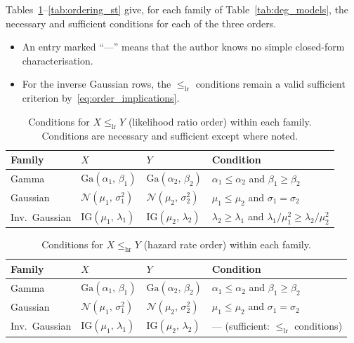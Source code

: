 \documentclass[11pt,a4paper]{article}
\theoremstyle{plain}
\theoremstyle{definition}
\theoremstyle{remark}
\begin{document}
Tables~\ref{tab:ordering_lr}--\ref{tab:ordering_st} give, for each family of Table~\ref{tab:deg_models}, the necessary and sufficient conditions for each of the three orders.
\begin{itemize}
  \item An entry marked ``---'' means that the author knows no simple closed-form characterisation.
  \item For the inverse Gaussian rows, the $\le_{\mathrm{lr}}$ conditions remain a valid sufficient criterion by~\eqref{eq:order_implications}.
\end{itemize}

\begin{table}[htbp]
\centering
\caption{Conditions for $X \le_{\mathrm{lr}} Y$ (likelihood ratio order) within each family.  Conditions are necessary and sufficient except where noted.}
\label{tab:ordering_lr}
\small
\begin{tabularx}{\linewidth}{@{}>{\hsize=0.604\hsize\raggedright\arraybackslash}X>{\hsize=1.094\hsize\raggedright\arraybackslash}X>{\hsize=1.151\hsize\raggedright\arraybackslash}X>{\hsize=1.151\hsize\raggedright\arraybackslash}X@{}}
\toprule
\rowcolor{headgrey}
\textbf{Family} & $X$ & $Y$ & \textbf{Condition} \\
\midrule
Gamma
  & $\mathrm{Ga}(\alpha_1,\,\beta_1)$
  & $\mathrm{Ga}(\alpha_2,\,\beta_2)$
  & $\alpha_1 \le \alpha_2$ and $\beta_1 \ge \beta_2$ \\[4pt]
Gaussian
  & $\mathcal{N}(\mu_1,\,\sigma_1^2)$
  & $\mathcal{N}(\mu_2,\,\sigma_2^2)$
  & $\mu_1 \le \mu_2$ and $\sigma_1 = \sigma_2$ \\[4pt]
Inv.\ Gaussian
  & $\mathrm{IG}(\mu_1,\,\lambda_1)$
  & $\mathrm{IG}(\mu_2,\,\lambda_2)$
  & $\lambda_2 \ge \lambda_1$ and $\lambda_1/\mu_1^2 \ge \lambda_2/\mu_2^2$ \\[4pt]
\bottomrule
\end{tabularx}
\end{table}

\begin{table}[htbp]
\centering
\caption{Conditions for $X \le_{\mathrm{hr}} Y$ (hazard rate order) within each family.}
\label{tab:ordering_hr}
\small
\begin{tabularx}{\linewidth}{@{}>{\hsize=0.604\hsize\raggedright\arraybackslash}X>{\hsize=1.094\hsize\raggedright\arraybackslash}X>{\hsize=1.151\hsize\raggedright\arraybackslash}X>{\hsize=1.151\hsize\raggedright\arraybackslash}X@{}}
\toprule
\rowcolor{headgrey}
\textbf{Family} & $X$ & $Y$ & \textbf{Condition} \\
\midrule
Gamma
  & $\mathrm{Ga}(\alpha_1,\,\beta_1)$
  & $\mathrm{Ga}(\alpha_2,\,\beta_2)$
  & $\alpha_1 \le \alpha_2$ and $\beta_1 \ge \beta_2$ \\[4pt]
Gaussian
  & $\mathcal{N}(\mu_1,\,\sigma_1^2)$
  & $\mathcal{N}(\mu_2,\,\sigma_2^2)$
  & $\mu_1 \le \mu_2$ and $\sigma_1 = \sigma_2$ \\[4pt]
Inv.\ Gaussian
  & $\mathrm{IG}(\mu_1,\,\lambda_1)$
  & $\mathrm{IG}(\mu_2,\,\lambda_2)$
  & --- (sufficient: $\le_{\mathrm{lr}}$ conditions) \\[4pt]
\bottomrule
\end{tabularx}
\end{table}
\end{document}
